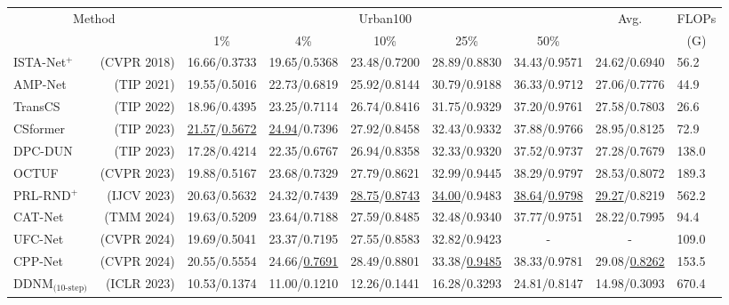 \documentclass[10pt,twocolumn,letterpaper]{article}
\begin{document}
\begin{table}[th]
	\begin{adjustbox}{width=\linewidth,center}
		\begin{tabular}{@{}lrccccccl@{}}
			\toprule
			\multicolumn{2}{c}{\multirow{2}{*}{Method}} & \multicolumn{5}{c}{Urban100\cite{Dong2018DenoisingPD}} & \multirow{2}{*}{Avg.} & \multicolumn{1}{c}{FLOPs} \\ \cmidrule(lr){3-7} 
			\multicolumn{2}{c}{} & 1\% & 4\% & 10\% & 25\% & 50\% &  & \multicolumn{1}{c}{(G)} \\ \midrule
			ISTA-Net$^+$\cite{zhang2018ista} & (CVPR 2018) & 16.66/0.3733 & 19.65/0.5368 & 23.48/0.7200 & 28.89/0.8830 & 34.43/0.9571 & 24.62/0.6940 & 56.2 \\
			AMP-Net\cite{zhang2020amp} & (TIP 2021) & 19.55/0.5016 & 22.73/0.6819 & 25.92/0.8144 & 30.79/0.9188 & 36.33/0.9712 & 27.06/0.7776 & 44.9 \\
			TransCS\cite{shen2022transcs} & (TIP 2022) & 18.96/0.4395 & 23.25/0.7114 & 26.74/0.8416 & 31.75/0.9329 & 37.20/0.9761 & 27.58/0.7803 & 26.6 \\
			CSformer\cite{ye2021csformer} & (TIP 2023) & \underline{21.57}/\underline{0.5672} & \underline{24.94}/0.7396 & 27.92/0.8458 & 32.43/0.9332 & 37.88/0.9766 & 28.95/0.8125 & 72.9 \\
			DPC-DUN\cite{DBLP:journals/tip/SongCZ23} & (TIP 2023) & 17.28/0.4214 & 22.35/0.6767 & 26.94/0.8358 & 32.33/0.9320 & 37.52/0.9737 & 27.28/0.7679 & 138.0 \\
			OCTUF\cite{Song2023OptimizationInspiredCT} & (CVPR 2023) & 19.88/0.5167 & 23.68/0.7329 & 27.79/0.8621 & 32.99/0.9445 & 38.29/0.9797 & 28.53/0.8072 & 189.3 \\
			PRL-RND$^+$\cite{DBLP:journals/ijcv/ChenSXZ23} & (IJCV 2023) & 20.63/0.5632 & 24.32/0.7439 & \underline{28.75}/\underline{0.8743} & \underline{34.00}/0.9483 & \underline{38.64}/\underline{0.9798} & \underline{29.27}/0.8219 & 562.2 \\
			CAT-Net\cite{DBLP:journals/tmm/KongCH24} & (TMM 2024) & 19.63/0.5209 & 23.64/0.7188 & 27.59/0.8485 & 32.48/0.9340 & 37.77/0.9751 & 28.22/0.7995 & 94.4 \\
			UFC-Net\cite{wangUFCNet2024} & (CVPR 2024) & 19.69/0.5041 & 23.37/0.7195 & 27.55/0.8583 & 32.82/0.9423 & - & - & 109.0 \\
			CPP-Net\cite{guoCPPNet2024} & (CVPR 2024) & 20.55/0.5554 & 24.66/\underline{0.7691} & 28.49/0.8801 & 33.38/\underline{0.9485} & 38.33/0.9781 & 29.08/\underline{0.8262} & 153.5 \\
			DDNM$_\text{(10-step)}$\cite{wang2022zero} & (ICLR 2023) & 10.53/0.1374 & 11.00/0.1210 & 12.26/0.1441 & 16.28/0.3293 & 24.81/0.8147 & 14.98/0.3093 & 670.4 \\

\end{tabular}
\end{adjustbox}
\end{table}
\end{document}
